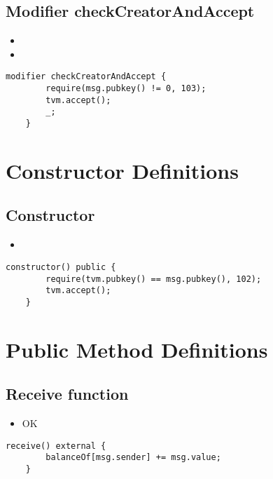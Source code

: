\subsection{Modifier checkCreatorAndAccept}

\begin{itemize}
\item {}
\item \issueError{}
\end{itemize}

\begin{lstlisting}[firstnumber=58]
	modifier checkCreatorAndAccept {
		require(msg.pubkey() != 0, 103);
		tvm.accept();
		_;
	}
\end{lstlisting}

\section{Constructor Definitions}

\subsection{Constructor}

\begin{itemize}
\item \issueNumber{}
\end{itemize}

\begin{lstlisting}[firstnumber=65]
	constructor() public {
		require(tvm.pubkey() == msg.pubkey(), 102);
		tvm.accept();
	}
\end{lstlisting}

\section{Public Method Definitions}

\subsection{Receive function}

\begin{itemize}
\item OK
\end{itemize}

\begin{lstlisting}[firstnumber=76]
	receive() external {
		balanceOf[msg.sender] += msg.value;
	}
\end{lstlisting}

